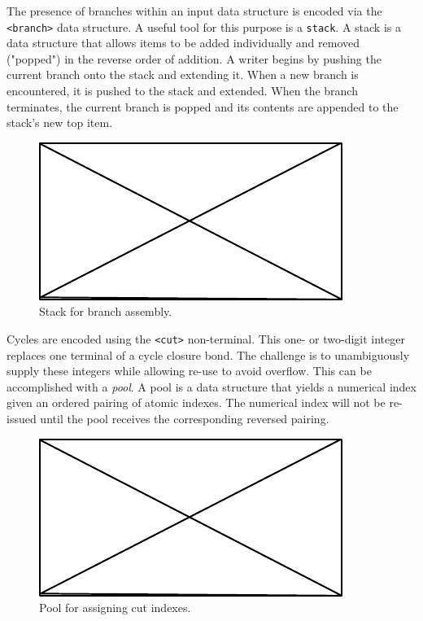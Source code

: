 \documentclass{article}
\def\ttt{\texttt}
\begin{document}
The presence of branches within an input data structure is encoded via the \ttt{<branch>} data structure. A useful tool for this purpose is a \ttt{stack}. A stack is a data structure that allows items to be added individually and removed ("popped") in the reverse order of addition. A writer begins by pushing the current branch onto the stack and extending it. When a new branch is encountered, it is pushed to the stack and extended. When the branch terminates, the current branch is popped and its contents are appended to the stack's new top item.

\begin{figure}
    \centering
    \includegraphics{filler}
    \caption{Stack for branch assembly.}
    \label{fig:branch-stack}
\end{figure}

Cycles are encoded using the \ttt{<cut>} non-terminal. This one- or two-digit integer replaces one terminal of a cycle closure bond. The challenge is to unambiguously supply these integers while allowing re-use to avoid overflow. This can be accomplished with a \textit{pool}. A pool is a data structure that yields a numerical index given an ordered pairing of atomic indexes. The numerical index will not be re-issued until the pool receives the corresponding reversed pairing.

\begin{figure}
    \centering
    \includegraphics{filler}
    \caption{Pool for assigning cut indexes.}
    \label{fig:pool}
\end{figure}
\end{document}
